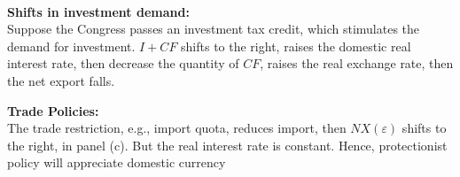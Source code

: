\documentclass[12pt]{article}
\begin{document}
\noindent{}\\





{\textbf {Shifts in investment demand:}}\\
Suppose the Congress passes an investment tax credit, which stimulates the demand
for investment. $ I + CF $ shifts to the right, raises the domestic real interest rate,
then decrease the quantity of $ CF $, raises the real exchange rate, then the net 
export falls.

\begin{figure}[H]
\end{figure}





{\textbf {Trade Policies:}}\\
The trade restriction, e.g., import quota, reduces import, then $ NX(\varepsilon) $
shifts to the right, in panel (c). But the real interest rate is constant. Hence, 
protectionist policy will appreciate domestic currency 
\end{document}
